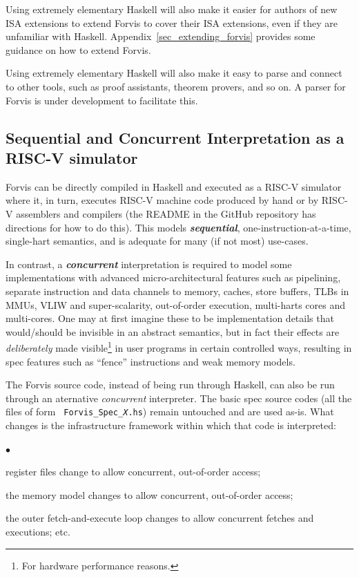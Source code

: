 \documentclass[11pt]{article}
\newenvironment{tightlist}%
{\begin{list}{$\bullet$}{%
    \setlength{\topsep}{0in}
    \setlength{\partopsep}{0in}
    \setlength{\itemsep}{0in}
    \setlength{\parsep}{0in}
    \setlength{\leftmargin}{1.5em}
    \setlength{\rightmargin}{0in}
    \setlength{\itemindent}{0in}
}
}%
{\end{list}
}
\begin{document}
Using extremely elementary Haskell will also make it easier for authors of
new ISA extensions to extend Forvis to cover their ISA extensions,
even if they are unfamiliar with Haskell.
Appendix~\ref{sec_extending_forvis} provides some guidance on how to
extend Forvis.

Using extremely elementary Haskell will also make it easy to parse and
connect to other tools, such as proof assistants, theorem provers, and
so on.  A parser for Forvis is under development to facilitate this.


\subsection{Sequential and Concurrent Interpretation as a RISC-V simulator}

\label{sec_sequential_and_concurrent}

Forvis can be directly compiled in Haskell and executed as a RISC-V
simulator where it, in turn, executes RISC-V machine code produced by
hand or by RISC-V assemblers and compilers (the README in the GitHub
repository has directions for how to do this).  This models
{\bf\emph{sequential}}, one-instruction-at-a-time, single-hart
semantics, and is adequate for many (if not most) use-cases.

In contrast, a {\bf\emph{concurrent}} interpretation is required to
model some implementations with advanced micro-architectural features
such as pipelining, separate instruction and data channels to memory,
caches, store buffers, TLBs in MMUs, VLIW and super-scalarity,
out-of-order execution, multi-harts cores and multi-cores.  One may at
first imagine these to be implementation details that would/should be
invisible in an abstract semantics, but in fact their effects are
\emph{deliberately} made visible\footnote{For hardware performance
reasons.} in user programs in certain controlled ways, resulting in
spec features such as ``fence'' instructions and weak memory models.

The Forvis source code, instead of being run through Haskell, can also
be run through an aternative \emph{concurrent} interpreter.  The basic
spec source codes (all the files of form {\tt
Forvis\_Spec\_{\it{}X}.hs}) remain untouched and are used as-is.  What
changes is the infrastructure framework within which that code is
interpreted:
\begin{tightlist}

\item register files change to allow concurrent, out-of-order access;

\item the memory model changes to allow concurrent, out-of-order access;

\item the outer fetch-and-execute loop changes to allow concurrent fetches and executions; etc.

\end{tightlist}
\end{document}
